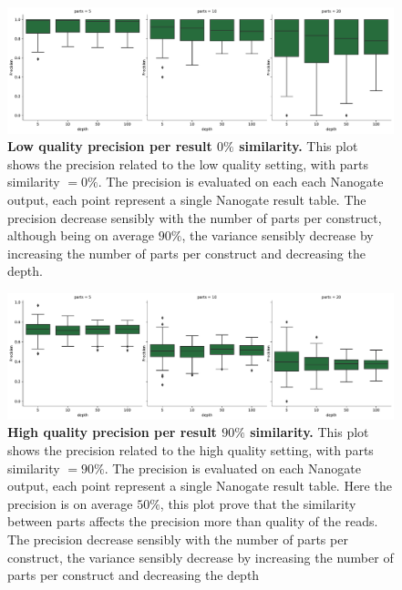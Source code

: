 \documentclass[11pt, a4paper]{article}
\begin{document}
\begin{figure}[ht]
    \begin{center}
    \includegraphics[width=1.35\textwidth]{../results/images_notebook/v_500/lq_sim_00_precision_per_result.pdf}
    \end{center}
    \caption{{\bf Low quality precision per result $0\%$ similarity.} This plot shows the precision related to the low quality setting, with parts similarity $=0\%$. The precision is evaluated on each each Nanogate output, each point represent a single Nanogate result table. The precision decrease sensibly with the number of parts per construct, although being on average $90\%$, the variance sensibly decrease by increasing the number of parts per construct and decreasing the depth.}
   \label{fig:v_500_lq_sim_00_precision_per_result}
\end{figure}

\begin{figure}[ht]
    \begin{center}
    \includegraphics[width=1.35\textwidth]{../results/images_notebook/v_500/hq_sim_90_precision_per_result.pdf}
    \end{center}
    \caption{{\bf High quality precision per result $90\%$ similarity.} This plot shows the precision related to the high quality setting, with parts similarity $=90\%$. The precision is evaluated on each  Nanogate output, each point represent a single Nanogate result table. Here the precision is on average $50\%$, this plot prove that the similarity between parts affects the precision more than quality of the reads. The precision decrease sensibly with the number of parts per construct, the variance sensibly decrease by increasing the number of parts per construct and decreasing the depth  }
   \label{fig:v_500_hq_sim_90_precision_per_result}
\end{figure}
\end{document}
